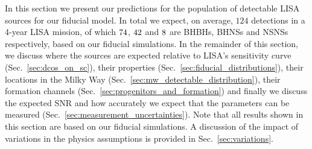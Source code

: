 In this section we present our predictions for the population of detectable LISA sources for our fiducial model. In total we expect, on average, $124$ detections in a 4-year LISA mission, of which $74{}$, $42{}$ and $8{}$ are BHBHs, BHNSs and NSNSs respectively, based on our fiducial simulations. In the remainder of this section, we discuss where the sources are expected relative to LISA's sensitivity curve (Sec.~\ref{sec:dcos_on_sc}), their properties (Sec.~\ref{sec:fiducial_distributions}), their locations in the Milky Way (Sec.~\ref{sec:mw_detectable_distribution}), their formation channels (Sec.~\ref{sec:progenitors_and_formation}) and finally we discuss the expected SNR and how accurately we expect that the parameters can be measured (Sec.~\ref{sec:measurement_uncertainties}). Note that all results shown in this section are based on our fiducial simulations. A discussion of the impact of variations in the physics assumptions is provided in Sec.~\ref{sec:variations}.

